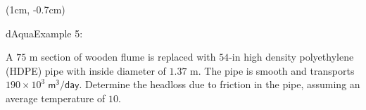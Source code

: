 \documentclass[9pt,xcolor=x11names,professionalfonts, mathserif]{beamer}
\begin{document}

\begin{frame}

	\begin{textblock*}{1\columnwidth}(1cm, -0.7cm)
		\begin{cmini}[0.8]{
			\begin{cb}[10]{dAqua}{Example 5:}{
				A $75\text{ m}$ section of wooden flume is replaced with $54\text{-in}$ high density polyethylene (HDPE) pipe with inside diameter of
				$1.37\text{ m}$.  The pipe is smooth and transports $190\times10^{3}\;\mathsf{ m^3/day}$. Determine the headloss due to friction in the
				pipe, assuming an average temperature of $10$\textcelsius.\par\smallskip }
			\end{cb} 
		}\end{cmini}
	\end{textblock*}

\end{frame}

\end{document}
